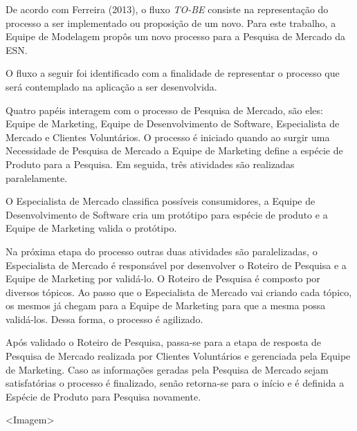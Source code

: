 	De acordo com Ferreira (2013), o fluxo \textit{TO-BE} consiste na representação do processo a ser implementado ou proposição de um novo. Para este trabalho, a Equipe de Modelagem propôs um novo processo para a Pesquisa de Mercado da ESN.

	O fluxo a seguir foi identificado com a finalidade de representar o processo que será contemplado na aplicação a ser desenvolvida.

	Quatro papéis interagem com o processo de Pesquisa de Mercado, são eles: Equipe de Marketing, Equipe de Desenvolvimento de Software, Especialista de Mercado e Clientes Voluntários. O processo é iniciado quando ao surgir uma Necessidade de Pesquisa de Mercado a Equipe de Marketing define a espécie de Produto para a Pesquisa. Em seguida, três atividades são realizadas paralelamente. 

	O Especialista de Mercado classifica possíveis consumidores, a Equipe de Desenvolvimento de Software cria um protótipo para espécie de produto e a Equipe de Marketing valida o protótipo.

	Na próxima etapa do processo outras duas atividades são paralelizadas, o Especialista de Mercado é responsável por desenvolver o Roteiro de Pesquisa e a Equipe de Marketing por validá-lo. O Roteiro de Pesquisa é composto por diversos tópicos. Ao passo que o Especialista de Mercado vai criando cada tópico, os mesmos já chegam para a Equipe de Marketing para que a mesma possa validá-los. Dessa forma, o processo é agilizado.

	Após validado o Roteiro de Pesquisa, passa-se para a etapa de resposta de Pesquisa de Mercado realizada por Clientes Voluntários e gerenciada pela Equipe de Marketing. Caso as informações geradas pela Pesquisa de Mercado sejam satisfatórias o processo é finalizado, senão retorna-se para o início e é definida a Espécie de Produto para Pesquisa novamente.


	<Imagem>
